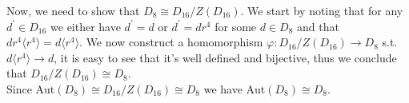 \documentclass{article}
\begin{document}
	Now, we need to show that $D_8 \cong D_{16}/Z(D_{16})$. We start by noting that for any $d^{'} \in D_{16}$ we either have $d^{'} = d \text{ or } d^{'} = dr^4$ for some $d \in D_8$ and that $dr^4 \langle r^4 \rangle = d \langle r^4 \rangle$. We now construct a homomorphism $\varphi : D_{16}/Z(D_{16}) \to D_8$ s.t. $d \langle r^4 \rangle \to d$, it is easy to see that it's well defined and bijective, thus we conclude that $D_{16}/Z(D_{16}) \cong D_8$. \\
	Since $\text{Aut}(D_8) \cong D_{16}/Z(D_{16}) \cong D_8$ we have $\text{Aut}(D_8) \cong D_8$.
\end{document}
